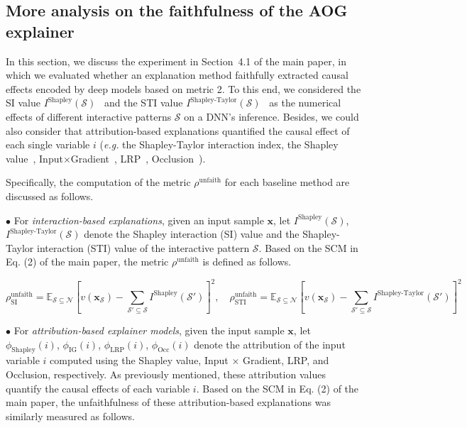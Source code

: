\subsection{More analysis on the faithfulness of the AOG explainer}
\label{sec:app-analyze-objectiveness}


In this section, we discuss the experiment in Section~4.1 of the main paper, in which we evaluated whether an explanation method faithfully extracted causal effects encoded by deep models based on metric 2.
To this end, we considered the SI value {\small$I^{\text{Shapley}}(\mathcal{S})$}~\cite{grabisch1999axiomatic} and the STI value {\small$I^{\text{Shapley-Taylor}}(\mathcal{S})$}~\cite{sundararajan2020shapley} as the numerical effects of different interactive patterns {\small$\mathcal{S}$} on a DNN's inference.
Besides, we could also consider that attribution-based explanations quantified the causal effect of each single variable {\small$i$} (\emph{e.g.} the Shapley-Taylor interaction index, the Shapley value~\cite{shapley1953value}, Input{\small$\times$}Gradient~\cite{shrikumar2016not}, LRP~\cite{bach2015pixel}, Occlusion~\cite{zeiler2014visualizing}).

Specifically, the computation of the metric {\small$\rho^{\text{unfaith}}$} for each baseline method are discussed as follows.

{\small$\bullet$} For \textit{interaction-based explanations}, given an input sample {\small$\boldsymbol{x}$}, let {\small$I^{\text{Shapley}}(\mathcal{S})$}, {\small$I^{\text{Shapley-Taylor}}(\mathcal{S})$} denote the Shapley interaction (SI) value and the Shapley-Taylor interaction (STI) value of the interactive pattern {\small$\mathcal{S}$}.
Based on the SCM in Eq. (2) of the main paper, the metric {\small$\rho^{\text{unfaith}}$} is defined as follows.

\begin{small}
\begin{equation}
    \rho^{\text{unfaith}}_{\text{SI}} = \mathbb{E}_{\mathcal{S}\subseteq \mathcal{N}}[v(\boldsymbol{x}_{\mathcal{S}})-{\sum}_{\mathcal{S}'\subseteq \mathcal{S}}I^{\text{Shapley}}(\mathcal{S}')]^2,\quad
    \rho^{\text{unfaith}}_{\text{STI}} = \mathbb{E}_{\mathcal{S}\subseteq \mathcal{N}}[v(\boldsymbol{x}_{\mathcal{S}})-{\sum}_{\mathcal{S}'\subseteq \mathcal{S}}I^{\text{Shapley-Taylor}}(\mathcal{S}')]^2
\end{equation}
\end{small}

{\small$\bullet$} For \textit{attribution-based explainer models}, given the input sample {\small$\boldsymbol{x}$}, let {\small$\phi_{\text{Shapley}}(i)$}, {\small$\phi_{\text{IG}}(i)$}, {\small$\phi_{\text{LRP}}(i)$}, {\small$\phi_{\text{Occ}}(i)$} denote the attribution of the input variable {\small$i$} computed using the Shapley value, Input {\small$\times$} Gradient, LRP, and Occlusion, respectively.
As previously mentioned, these attribution values quantify the causal effects of each variable {\small$i$}.
Based on the SCM in Eq. (2) of the main paper, the unfaithfulness of these attribution-based explanations was similarly measured as follows.

